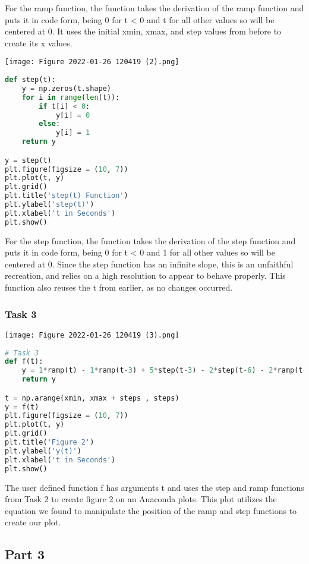 \documentclass[11pt,a4]{article}
\begin{document}
For the ramp function, the function takes the derivation of the ramp function and puts it in code form, being 0 for t < 0 and t for all other values so will be centered at 0. It uses the initial xmin, xmax, and step values from before to create its x values.

\texttt{[image: Figure 2022-01-26 120419 (2).png]}

\begin{lstlisting}[language=Python]
def step(t):
    y = np.zeros(t.shape)
    for i in range(len(t)):
        if t[i] < 0:
            y[i] = 0
        else:
            y[i] = 1
    return y

y = step(t)
plt.figure(figsize = (10, 7))
plt.plot(t, y)
plt.grid()
plt.title('step(t) Function')
plt.ylabel('step(t)')
plt.xlabel('t in Seconds')
plt.show()
\end{lstlisting}

For the step function, the function takes the derivation of the step function and puts it in code form, being 0 for t < 0 and 1 for all other values so will be centered at 0. Since the step function has an infinite slope, this is an unfaithful recreation, and relies on a high resolution to appear to behave properly. This function also reuses the t from earlier, as no changes occurred.

\subsubsection{Task 3}

\texttt{[image: Figure 2022-01-26 120419 (3).png]}

\begin{lstlisting}[language=Python]
# Task 3
def f(t):
    y = 1*ramp(t) - 1*ramp(t-3) + 5*step(t-3) - 2*step(t-6) - 2*ramp(t-6)
    return y

t = np.arange(xmin, xmax + steps , steps)
y = f(t)
plt.figure(figsize = (10, 7))
plt.plot(t, y)
plt.grid()
plt.title('Figure 2')
plt.ylabel('y(t)')
plt.xlabel('t in Seconds')
plt.show()
\end{lstlisting}

The user defined function f has arguments t and uses the step and ramp functions from Task 2 to create figure 2 on an Anaconda plots. This plot utilizes the equation we found to manipulate the position of the ramp and step functions to create our plot.

\subsection{Part 3}
\end{document}
